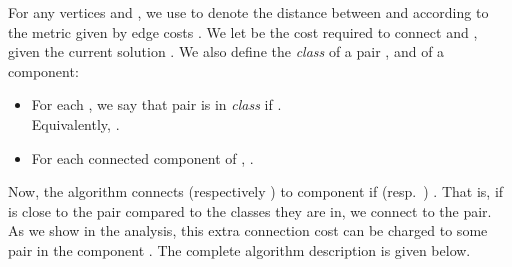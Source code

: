 \documentclass[11pt]{article}
\newcounter{thm0Rcopies}
\newcounter{thm_saved}
\begin{document}
For any vertices  and , we use  to denote the distance
between  and  according to the metric given by edge costs
. We let  be the cost required to
connect  and , given the current solution . We also
define the \emph{class} of a pair , and of a component:
\vspace{-2mm}
\begin{itemize}
  \item For each , we say that pair  is in
    \emph{class}  if .\\
    Equivalently, .

  \item For each connected component  of , . 
\end{itemize}

\vspace{-2mm}
\noindent 
Now, the algorithm connects  (respectively ) to component
 if  (resp.~) . That is, if  is close to the pair 
compared to the classes they are in, we connect  to the pair. As we
show in the analysis, this extra connection cost can be charged to
some pair  in the component . The complete algorithm
description is given below.


\iffalse 
We define the algorithm more precisely below.  At every stage of the
algorithm we maintain a forest  in which every pair seen so far is
connected.  In iteration We now divide the pairs into various classes
based on their connection costs.  In particular, we say a pair
 is in {\em class}  if .
Equivalently, . For a component 
in , we define . Depending on the classes of the various components in ,
we connect  to some additional components. In particular, if
either  or  is less
than , then we connect  or 
to .
\fi
\end{document}
